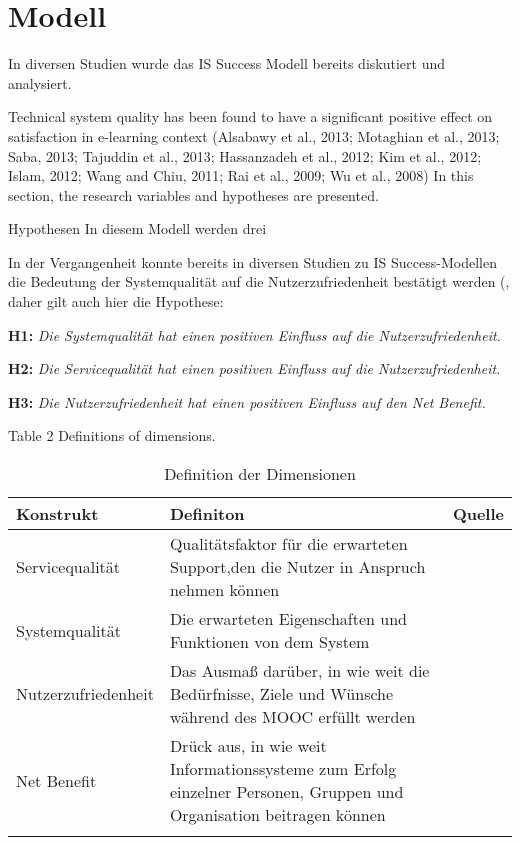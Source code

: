 \section{Modell}
\label{sec:modell}
In diversen Studien wurde das IS Success Modell bereits diskutiert und analysiert. 

Technical system quality has been found to have a significant positive effect on satisfaction in e-learning context (Alsabawy et al., 2013; Motaghian et al., 2013; Saba, 2013; Tajuddin et al., 2013; Hassanzadeh et al., 2012; Kim et al., 2012; Islam, 2012; Wang and Chiu, 2011; Rai et al., 2009; Wu et al., 2008)
In this section, the research variables and hypotheses are presented.

Hypothesen 
In diesem Modell werden drei 

In der Vergangenheit konnte bereits in diversen Studien zu IS Success-Modellen die Bedeutung der Systemqualität auf die Nutzerzufriedenheit bestätigt werden (, daher gilt auch hier die Hypothese: 
  
\textbf{H1:} \textit{Die Systemqualität hat einen positiven Einfluss auf die Nutzerzufriedenheit.}


\textbf{H2:} \textit{Die Servicequalität hat einen positiven Einfluss auf die Nutzerzufriedenheit.}

\textbf{H3:} \textit{Die Nutzerzufriedenheit hat einen positiven Einfluss auf den Net Benefit.} 



Table 2
Definitions of dimensions.

\begin{table}[ht] 
\footnotesize
\caption{Definition der Dimensionen}
\label{tab:Dimensionen} 
\begin{tabular}{@{}lp{9cm}l@{}} \toprule

\textbf{Konstrukt} & \textbf{Definiton} & \textbf{Quelle} \\ \midrule



Servicequalität & Qualitätsfaktor für die erwarteten Support,den die Nutzer in Anspruch nehmen können & \parbox[t]{4cm}{\cite{petter2008measuring}}\\ 
Systemqualität & Die erwarteten Eigenschaften und Funktionen von dem System & \parbox[t]{4cm}{\cite{petter2008measuring}}\\ Nutzerzufriedenheit & Das Ausmaß darüber, in wie weit die Bedürfnisse, Ziele und Wünsche während des MOOC erfüllt werden & \parbox[t]{4cm}{\cite{sanchez2009moderating}}\\ 
Net Benefit & \parbox[t]{9cm}{Drück aus, in wie weit Informationssysteme zum Erfolg einzelner Personen, Gruppen und Organisation beitragen können}  & \parbox[t]{4cm}{\cite{conf/gi/GemlikNSB10} \cite{Petter:0aa} }\\ \addlinespace 
  \bottomrule

\end{tabular}	
\end{table}


